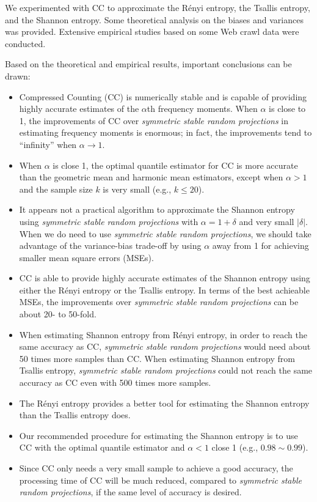 \documentclass{sig-alternate}
\begin{document}
We experimented with CC to approximate the R\'enyi entropy, the Tsallis entropy, and the Shannon entropy. Some theoretical analysis on the biases and variances was provided. Extensive empirical studies based on some Web crawl data were conducted.

Based on the theoretical and empirical results, important conclusions can be drawn:
\begin{itemize}
\item Compressed Counting (CC) is numerically stable and is capable of providing highly accurate estimates of the $\alpha$th frequency moments. When $\alpha$ is close to 1, the improvements of CC over {\em symmetric stable random projections} in estimating frequency moments is enormous; in fact, the improvements tend to ``infinity'' when $\alpha\rightarrow 1$.
\item When $\alpha$ is close 1,  the optimal quantile estimator for CC is more accurate than the geometric mean and harmonic mean estimators, except when $\alpha>1$ and the sample size $k$ is very small (e.g., $k\leq 20$).
\item It appears not a practical algorithm to approximate the Shannon entropy using {\em symmetric stable random projections} with $\alpha =1+\delta$  and very small $|\delta|$. When we do need to use {\em symmetric stable random projections}, we should take advantage of the variance-bias trade-off by using $\alpha$ away from 1 for achieving smaller mean square errors (MSEs).

\item CC is able to provide highly accurate estimates of the Shannon entropy using either the R\'enyi entropy or the Tsallis entropy. In terms of the best achieable MSEs, the improvements over {\em symmetric stable random projections} can be about 20- to 50-fold.
\item When estimating Shannon entropy from R\'enyi entropy, in order to reach the same accuracy as CC, {\em symmetric stable random projections} would need about 50 times more samples than CC. When estimating Shannon entropy from Tsallis entropy, {\em symmetric stable random projections}  could not reach the same accuracy as CC even with 500 times more samples.
\item The R\'enyi entropy provides a better tool for estimating the Shannon entropy than the Tsallis entropy does.
\item Our recommended procedure for estimating the Shannon entropy is to use CC with the optimal quantile estimator and $\alpha<1$ close 1 (e.g., $0.98\sim 0.99$).
\item Since CC only needs a very small sample to achieve a good accuracy, the processing time of CC will be much reduced, compared to {\em symmetric stable random projections}, if the same level of accuracy is desired.
\end{itemize}
\end{document}
